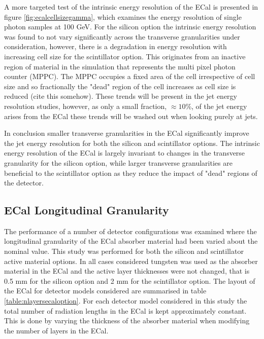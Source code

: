 A more targeted test of the intrinsic energy resolution of the ECal is presented in figure \ref{fig:ecalcellsizegamma}, which examines the energy resolution of single photon samples at 100 GeV.  For the silicon option the intrinsic energy resolution was found to not vary significantly across the transverse granularities under consideration, however, there is a degradation in energy resolution with increasing cell size for the scintillator option.  This originates from an inactive region of material in the simulation that represents the multi pixel photon counter (MPPC).  The MPPC occupies a fixed area of the cell irrespective of cell size and so fractionally the "dead" region of the cell increases as cell size is reduced (cite this somehow).  These trends will be present in the jet energy resolution studies, however, as only a small fraction, $\approx 10$\%, of the jet energy arises from the ECal these trends will be washed out when looking purely at jets.

In conclusion smaller transverse granularities in the ECal significantly improve the jet energy resolution for both the silicon and scintillator options.  The intrinsic energy resolution of the ECal is largely invariant to changes in the transverse granularity for the silicon option, while larger transverse granularities are beneficial to the scintillator option as they reduce the impact of "dead" regions of the detector.  

\subsection{ECal Longitudinal Granularity}
\label{sec:ecalnlayers}
The performance of a number of detector configurations was examined where the longitudinal granularity of the ECal absorber material had been varied about the nominal value.  This study was performed for both the silicon and scintillator active material options.  In all cases considered tungsten was used as the absorber material in the ECal and the active layer thicknesses were not changed, that is 0.5 mm for the silicon option and 2 mm for the scintillator option.  The layout of the ECal for detector models considered are summarised in table \ref{table:nlayersecaloption}.  For each detector model considered in this study the total number of radiation lengths in the ECal is kept approximately constant.  This is done by varying the thickness of the absorber material when modifying the number of layers in the ECal. 

